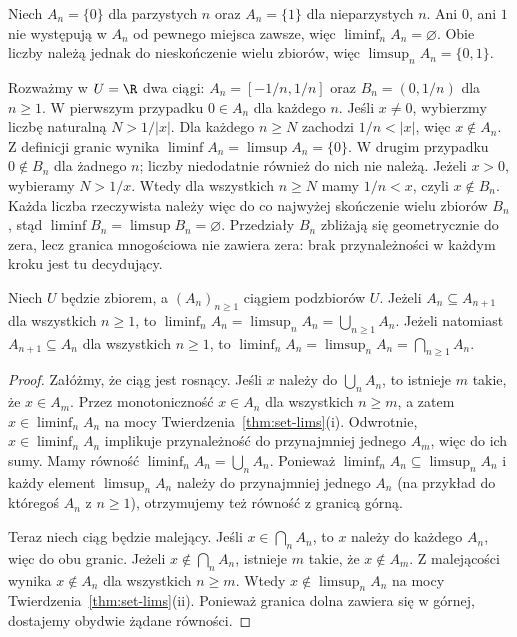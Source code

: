 \begin{przyklad}
Niech $A_n=\{0\}$ dla parzystych $n$ oraz $A_n=\{1\}$
dla nieparzystych $n$. Ani $0$, ani $1$ nie występują w
$A_n$ od pewnego miejsca zawsze, więc $\liminf_n A_n=\varnothing$.
Obie liczby należą jednak do nieskończenie wielu zbiorów,
więc $\limsup_n A_n=\{0,1\}$.
\end{przyklad}

\begin{przyklad}
\label{ex:set-limits-boundary-xlii}
Rozważmy w $U=\R$ dwa ciągi:
$A_n=[-1/n,1/n]$ oraz $B_n=(0,1/n)$ dla $n\ge1$.
W pierwszym przypadku $0\in A_n$ dla każdego $n$.
Jeśli $x\ne0$, wybierzmy liczbę naturalną $N>1/|x|$.
Dla każdego $n\ge N$ zachodzi $1/n<|x|$,
więc $x\notin A_n$. Z definicji granic wynika
$\liminf A_n=\limsup A_n=\{0\}$.
W drugim przypadku $0\notin B_n$ dla żadnego $n$;
liczby niedodatnie również do nich nie należą.
Jeżeli $x>0$, wybieramy $N>1/x$. Wtedy dla wszystkich
$n\ge N$ mamy $1/n<x$, czyli $x\notin B_n$.
Każda liczba rzeczywista należy więc do co najwyżej
skończenie wielu zbiorów $B_n$, stąd
$\liminf B_n=\limsup B_n=\varnothing$.
Przedziały $B_n$ zbliżają się geometrycznie do zera,
lecz granica mnogościowa nie zawiera zera: brak
przynależności w każdym kroku jest tu decydujący.
\end{przyklad}


\begin{twierdzenie}\label{thm:monotone-sets}
Niech $U$ będzie zbiorem, a $(A_n)_{n\ge1}$ ciągiem podzbiorów $U$.
Jeżeli $A_n\subseteq A_{n+1}$ dla wszystkich $n\ge1$,
to $\liminf_n A_n=\limsup_n A_n=\bigcup_{n\ge1}A_n$.
Jeżeli natomiast $A_{n+1}\subseteq A_n$ dla wszystkich
$n\ge1$, to $\liminf_n A_n=\limsup_n A_n=\bigcap_{n\ge1}A_n$.
\end{twierdzenie}
\begin{proof}
Załóżmy, że ciąg jest rosnący. Jeśli $x$ należy do
$\bigcup_n A_n$, to istnieje $m$ takie, że $x\in A_m$.
Przez monotoniczność $x\in A_n$ dla wszystkich $n\ge m$,
a zatem $x\in\liminf_n A_n$ na mocy
Twierdzenia~\ref{thm:set-lims}(i). Odwrotnie,
$x\in\liminf_n A_n$ implikuje przynależność do przynajmniej
jednego $A_m$, więc do ich sumy. Mamy równość
$\liminf_n A_n=\bigcup_n A_n$. Ponieważ
$\liminf_n A_n\subseteq\limsup_n A_n$ i każdy element
$\limsup_n A_n$ należy do przynajmniej jednego $A_n$
(na przykład do któregoś $A_n$ z $n\ge1$), otrzymujemy też
równość z granicą górną.

Teraz niech ciąg będzie malejący. Jeśli $x\in\bigcap_n A_n$,
to $x$ należy do każdego $A_n$, więc do obu granic.
Jeżeli $x\notin\bigcap_n A_n$, istnieje $m$ takie, że
$x\notin A_m$. Z malejącości wynika $x\notin A_n$
dla wszystkich $n\ge m$. Wtedy $x\notin\limsup_n A_n$
na mocy Twierdzenia~\ref{thm:set-lims}(ii).
Ponieważ granica dolna zawiera się w górnej, dostajemy
obydwie żądane równości.
\end{proof}

